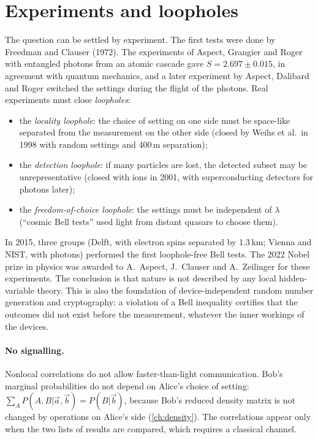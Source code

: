 \section{Experiments and loopholes}
The question can be settled by experiment. The first tests were done by Freedman and Clauser (1972). The experiments of Aspect, Grangier and Roger \cite{Aspect1982} with
entangled photons from an atomic cascade gave $S=2.697\pm0.015$, in agreement with quantum mechanics, and a later experiment by Aspect, Dalibard and Roger switched the
settings during the flight of the photons. Real experiments must close \emph{loopholes}:
\begin{itemize}
  \item the \emph{locality loophole}: the choice of setting on one side must be space-like separated from the measurement on the other side (closed by Weihs et al.\ in 1998
  with random settings and 400\,m separation);
  \item the \emph{detection loophole}: if many particles are lost, the detected subset may be unrepresentative (closed with ions in 2001, with superconducting detectors for photons later);
  \item the \emph{freedom-of-choice loophole}: the settings must be independent of $\lambda$ (``cosmic Bell tests'' used light from distant quasars to choose them).
\end{itemize}
In 2015, three groups (Delft, with electron spins separated by 1.3\,km; Vienna and NIST, with photons) performed the first loophole-free Bell tests. The 2022 Nobel prize
in physics was awarded to A.~Aspect, J.~Clauser and A.~Zeilinger for these experiments. The conclusion is that nature is not described by any local hidden-variable theory.
This is also the foundation of device-independent random number generation and cryptography: a violation of a Bell inequality certifies that the outcomes did not exist before
the measurement, whatever the inner workings of the devices.

\paragraph{No signalling.} Nonlocal correlations do not allow faster-than-light communication. Bob's marginal probabilities do not depend on Alice's choice of setting:
$\sum_AP(A,B|\vec a,\vec b)=P(B|\vec b)$, because Bob's reduced density matrix is not changed by operations on Alice's side (\cref{ch:density}). The correlations appear only
when the two lists of results are compared, which requires a classical channel.

